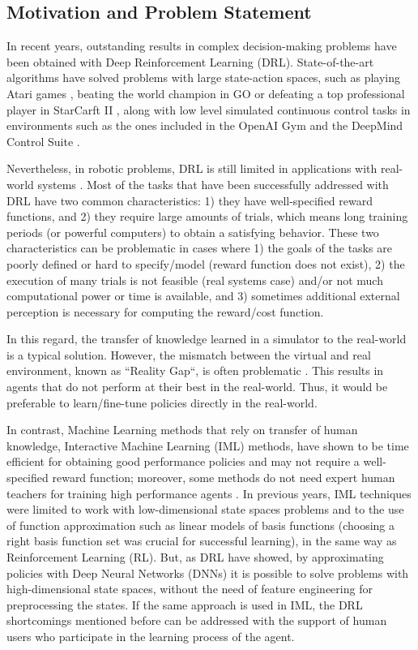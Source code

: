 \begin{intro}
\section{Motivation and Problem Statement}
In  recent years, outstanding results in complex decision-making problems have been obtained with Deep Reinforcement Learning (DRL). State-of-the-art algorithms have solved problems with large state-action spaces, such as playing Atari games \cite{atari}, beating the world champion in GO \cite{Silver2016} or defeating a top professional player in StarCarft II \cite{alphastarblog}, along with low level simulated continuous control tasks in environments such as the ones included in the OpenAI Gym \cite{brockman2016openai} and the DeepMind Control Suite \cite{tassa2018deepmind}. 

Nevertheless, in robotic problems, DRL is still limited in applications with real-world systems \cite{Gu2017}. Most of the tasks that have been successfully addressed with DRL have two common characteristics: 1) they have well-specified reward functions, and 2) they require large amounts of trials, which means long training periods (or powerful computers) to obtain a satisfying behavior. These two characteristics can be problematic in cases where 1) the goals of the tasks are poorly defined or hard to specify/model (reward function does not exist), 2) the execution of many trials is not feasible (real systems case) and/or not much computational power or time is available, and 3) sometimes additional external perception is necessary for computing the reward/cost function.

In this regard, the transfer of knowledge learned in a simulator to the real-world is a typical solution. However, the mismatch between the virtual and real environment, known as ``Reality Gap``, is often problematic \cite{koos2013transferability}. This results in agents that do not perform at their best in the real-world. Thus, it would be preferable to learn/fine-tune policies directly in the real-world.

In contrast, Machine Learning methods that rely on transfer of human knowledge, Interactive Machine Learning (IML) methods, have shown to be time efficient for obtaining good performance policies and may not require a well-specified reward function; moreover, some methods do not need expert human teachers for training high performance agents \cite{akrour2011preference,Knox:2009:ISA:1597735.1597738,Celemin2018AnInteractive}. In previous years, IML techniques were limited to work with low-dimensional state spaces problems and to the use of function approximation such as linear models of basis functions (choosing a right basis function set was crucial for successful learning), in the same way as Reinforcement Learning (RL). But, as DRL have showed, by approximating policies with Deep Neural Networks (DNNs) it is possible to solve problems with high-dimensional state spaces, without the need of feature engineering for preprocessing the states. If the same approach is used in IML, the DRL shortcomings mentioned before can be addressed with the support of human users who participate in the learning process of the agent.


\end{intro}
